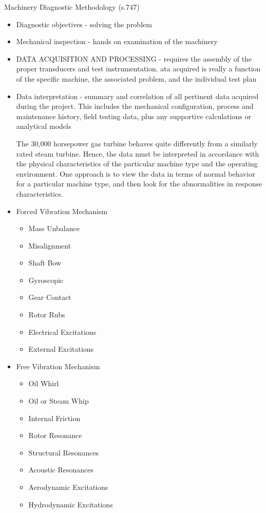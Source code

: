 Machinery Diagnostic Methodology (s.747)
\begin{itemize}
	\item Diagnostic objectives - solving the problem
	\item Mechanical inspection - hands on examination of the machinery
	\item DATA ACQUISITION AND PROCESSING - requires the assembly of the proper transducers and test instrumentation. ata acquired is really a function of the specific machine, the associated problem, and the individual test plan
	\item Data interpretation - summary and correlation of all pertinent data acquired during the project. This includes the mechanical configuration, process and maintenance history, field testing data, plus any supportive calculations or analytical models
	
The 30,000 horsepower gas turbine behaves quite differently from a similarly rated steam turbine. Hence, the data must be interpreted in accordance with the physical characteristics of the particular machine type and the operating environment. One approach is to view the data in terms of normal behavior for a particular machine type, and then look for the abnormalities in response characteristics.
\end{itemize}
 \cite{eisenmann_machinery_1997}
\begin{itemize}
\item Forced Vibration Mechanism
	\begin{itemize}
	\item Mass Unbalance
	\item Misalignment
	\item 	Shaft Bow
	\item Gyroscopic
	\item Gear Contact
	\item Rotor Rubs
	\item Electrical Excitations
	\item External Excitations
	\end{itemize}
\item Free Vibration Mechanism
	\begin{itemize}
	\item Oil Whirl
	\item Oil or Steam Whip
	\item  Internal Friction
	\item Rotor Resonance
	\item Structural Resonances
	\item Acoustic Resonances
	\item Aerodynamic Excitations
	\item Hydrodynamic Excitations
	\end{itemize}
\end{itemize}

